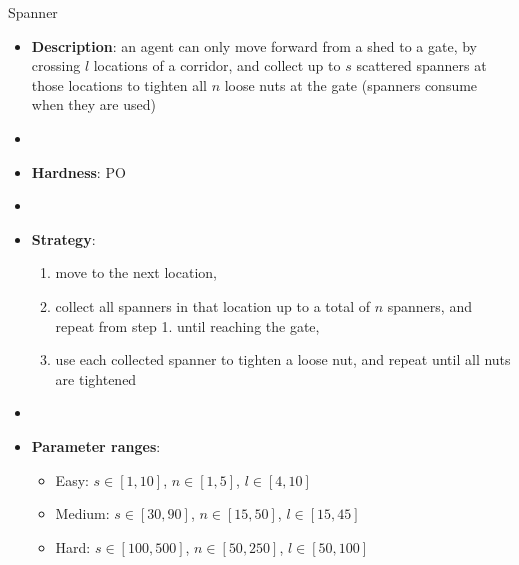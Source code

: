 \documentclass[aspectratio=169,xcolor=dvipsnames]{beamer}
\begin{document}
\begin{frame}{Spanner}

    \begin{itemize}
        \item \textbf{Description}: an agent can only move forward from a shed to a gate, by crossing $l$ locations of a corridor, and collect up to $s$ scattered spanners at those locations to tighten all $n$ loose nuts at the gate (spanners consume when they are used)
        \item[]
        \item \textbf{Hardness}: PO %
        \item[]
        \item \textbf{Strategy}: 
        \begin{enumerate}
            \item move to the next location,
            \item collect all spanners in that location up to a total of $n$ spanners, and repeat from step 1. until reaching the gate,
            \item use each collected spanner to tighten a loose nut, and repeat until all nuts are tightened
        \end{enumerate}
        \item[] 
        \item \textbf{Parameter ranges}:
        \begin{itemize}
            \item Easy: $s\in[1,10]$, $n\in[1, 5]$, $l\in[4, 10]$
            \item Medium: $s\in[30,90]$, $n\in[15, 50]$, $l\in[15, 45]$
            \item Hard: $s\in[100,500]$, $n\in[50, 250]$, $l\in[50, 100]$
        \end{itemize}
    \end{itemize}

\end{frame}
\end{document}
